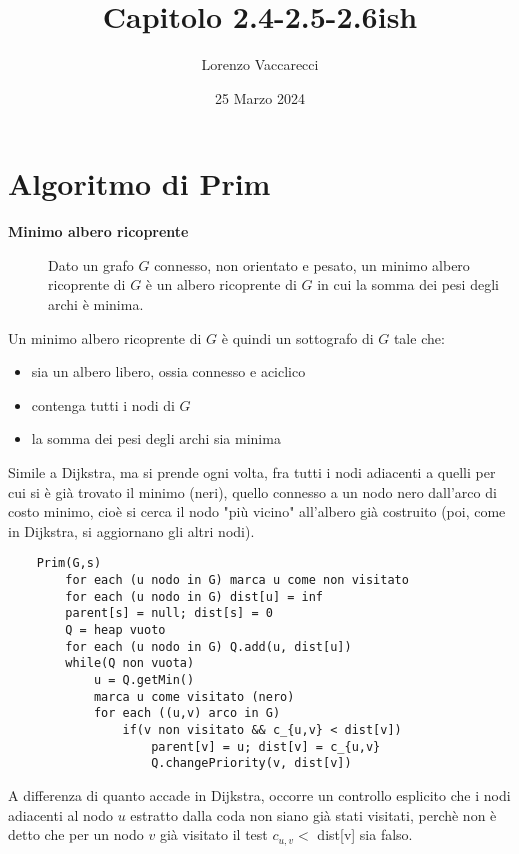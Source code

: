 \documentclass[12pt]{article}
\title{Capitolo 2.4-2.5-2.6ish}
\author{Lorenzo Vaccarecci}
\date{25 Marzo 2024}
\begin{document}
\maketitle
\section{Algoritmo di Prim}
\begin{description}
    \item[\textbf{Minimo albero ricoprente}] Dato un grafo $G$ connesso, non orientato e pesato, un minimo albero ricoprente di $G$ è un albero ricoprente di $G$ in cui la somma dei pesi degli archi è minima.
\end{description}
Un minimo albero ricoprente di $G$ è quindi un sottografo di $G$ tale che:
\begin{itemize}
    \item sia un albero libero, ossia connesso e aciclico
    \item contenga tutti i nodi di $G$
    \item la somma dei pesi degli archi sia minima
\end{itemize}
Simile a Dijkstra, ma si prende ogni volta, fra tutti i nodi adiacenti a quelli per cui si è già trovato il minimo (neri), quello connesso a un nodo nero dall'arco di costo minimo, cioè si cerca il nodo "più vicino" all'albero già costruito (poi, come in Dijkstra, si aggiornano gli altri nodi).
\begin{verbatim}
    Prim(G,s)
        for each (u nodo in G) marca u come non visitato
        for each (u nodo in G) dist[u] = inf
        parent[s] = null; dist[s] = 0
        Q = heap vuoto
        for each (u nodo in G) Q.add(u, dist[u])
        while(Q non vuota)
            u = Q.getMin()
            marca u come visitato (nero)
            for each ((u,v) arco in G)
                if(v non visitato && c_{u,v} < dist[v])
                    parent[v] = u; dist[v] = c_{u,v}
                    Q.changePriority(v, dist[v])
\end{verbatim}
A differenza di quanto accade in Dijkstra, occorre un controllo esplicito che i nodi adiacenti al nodo $u$ estratto dalla coda non siano già stati visitati, perchè non è detto che per un nodo $v$ già visitato il test $c_{u,v} < $ dist[v] sia falso.
\end{document}
